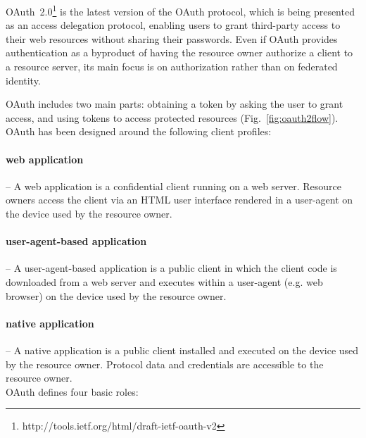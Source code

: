 \documentclass[a4paper]{llncs}
\begin{document}
OAuth~2.0\footnote{http://tools.ietf.org/html/draft-ietf-oauth-v2} is the latest version of the OAuth protocol, which is being presented as an access delegation protocol, enabling users to grant third-party access to their web resources without sharing their passwords. Even if OAuth provides authentication as a byproduct of having the resource owner authorize a client to a resource server, its main focus is on authorization rather than on federated identity.


OAuth includes two main parts: obtaining a token by asking the user to grant access, and using tokens to access protected resources (Fig.~\ref{fig:oauth2flow}). OAuth has been designed around the following client profiles:

\paragraph*{web application} -- A web application is a confidential client running on a web server. Resource owners access the client via an HTML user interface rendered in a user-agent on the device used by the resource owner.

\paragraph*{user-agent-based application} -- A user-agent-based application is a public client in which the client code is downloaded from a web server and executes within a user-agent (e.g. web browser) on the device used by the resource owner.

\paragraph*{native application} -- A native application is a public client installed and executed on the device used by the resource owner. Protocol data and credentials are accessible to the resource owner.\\

OAuth defines four basic roles: 
\end{document}
